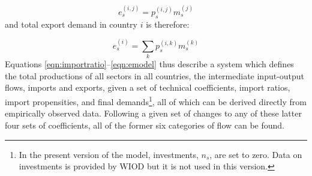 \documentclass[a4paper]{article}
\begin{document}
\begin{equation*}
e_s^{(i,j)} = p_s^{(i,j)}m_s^{(j)}
\end{equation*}
and total export demand in country $i$ is therefore:

\begin{equation}\label{eqn:emodel}
e_s^{(i)} = \sum_k{p_s^{(i,k)}m_s^{(k)}}
\end{equation}
Equations \eqref{eqn:importratio}--\eqref{eqn:emodel} thus describe a system which defines the total productions of all sectors in all countries, the intermediate input-output flows, imports and exports, given a set of technical coefficients, import ratios, import propensities, and final demands\footnote{In the present version of the model, investments, $n_s$, are set to zero. 
Data on investments is provided by WIOD but it is not used in this version.}, all of which can be derived directly from empirically observed data.
Following a given set of changes to any of these latter four sets of coefficients, all of the former six categories of flow can be found.
\end{document}
